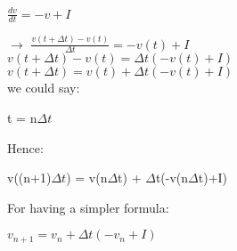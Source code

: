\documentclass[12pt]{article}
\begin{document}
$\frac{dv}{dt} = -v + I$

$\rightarrow$ $\frac{v(t+\Delta t)-v(t)}{\Delta t} = -v(t)+I$ \\
$v(t+\Delta t)-v(t) = \Delta t(-v(t)+I) $ \\


$v(t+\Delta t) = v(t)+\Delta t(-v(t)+I)$ \\


we could say:\\
\begin{center}
			t = n$\Delta t$\\
\end{center}
Hence: \\
	\begin{center}
	v((n+1)$\Delta t$) = v(n$\Delta$t) + $\Delta$t(-v(n$\Delta$t)+I)\\
	\end{center}

For having a simpler formula:\\
	\begin{center}
		$v_{n+1} = v_n + \Delta t (-v_n+I)$\\
	\end{center}
\end{document}

